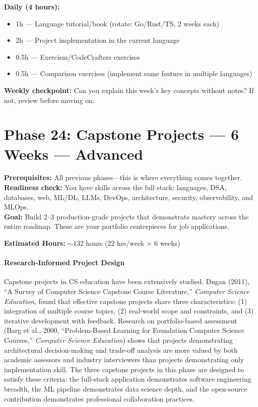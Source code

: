 \documentclass[11pt, a4paper, oneside]{report}
\begin{document}
\begin{practicebox}
\textbf{Daily (4 hours):}
\begin{itemize}[leftmargin=*]
\item 1h --- Language tutorial/book (rotate: Go/Rust/TS, 2 weeks each)
\item 2h --- Project implementation in the current language
\item 0.5h --- Exercism/CodeCrafters exercises
\item 0.5h --- Comparison exercises (implement same feature in multiple languages)
\end{itemize}


\textbf{Weekly checkpoint:} Can you explain this week's key concepts without notes? If not, review before moving on.
\end{practicebox}

\clearpage
\section[Phase 24: Capstone Projects]{Phase 24: Capstone Projects --- 6 Weeks --- Advanced}

\begin{prereqbox}
\textbf{Prerequisites:} All previous phases---this is where everything comes together.\\
\textbf{Readiness check:} You have skills across the full stack: languages, DSA, databases, web, ML/DL, LLMs, DevOps, architecture, security, observability, and MLOps.\\
\textbf{Goal:} Build 2--3 production-grade projects that demonstrate mastery across the entire roadmap. These are your portfolio centerpieces for job applications.


\textbf{Estimated Hours:} $\sim$132 hours (22 hrs/week $\times$ 6 weeks)
\end{prereqbox}


\paragraph{Research-Informed Project Design} Capstone projects in CS education have been extensively studied. Dugan (2011), ``A Survey of Computer Science Capstone Course Literature,'' \emph{Computer Science Education}, found that effective capstone projects share three characteristics: (1) integration of multiple course topics, (2) real-world scope and constraints, and (3) iterative development with feedback. Research on portfolio-based assessment (Barg et al., 2000, ``Problem-Based Learning for Foundation Computer Science Courses,'' \emph{Computer Science Education}) shows that projects demonstrating architectural decision-making and trade-off analysis are more valued by both academic assessors and industry interviewers than projects demonstrating only implementation skill. The three capstone projects in this phase are designed to satisfy these criteria: the full-stack application demonstrates software engineering breadth, the ML pipeline demonstrates data science depth, and the open-source contribution demonstrates professional collaboration practices.
\end{document}

